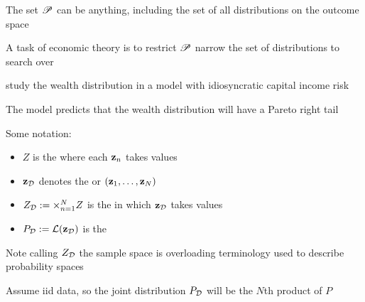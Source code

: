 \begin{frame}

    \vspace{2em}
    The set $\mathscr P$ can be anything, including the set of all distributions 
    on the outcome space
    
    \vspace{.7em}
    A task of economic theory is to restrict $\mathscr P$ narrow the set of 
    distributions to search over
    
    \vspace{.7em}
    \Eg
    \cite{benhabib2015wealth} study the wealth distribution in a model with
    idiosyncratic capital income risk
    
    The model predicts that the wealth
    distribution will have a Pareto right tail
    
\end{frame}

\begin{frame}
    
    \vspace{2em}
    Some notation:
    \begin{itemize}
        \label{enum:sen}
        \item $Z$ is the  where each 
            ${\mathbf z}_n$ takes values
        \item $\mathbf{z}_{\mathcal D}$ denotes the  or  $({\mathbf z}_1, \ldots,
            {\mathbf z}_N)$
        \item $Z_{\mathcal D} := \times_{n=1}^N Z$ is the  
            in which $\mathbf{z}_{\mathcal D}$ takes values
        \item $P_{\mathcal D} := \mathcal L(\mathbf{z}_{\mathcal D})$ is the 
    \end{itemize}
    
    Note calling $Z_{\mathcal D}$ the sample space is overloading terminology 
    used to describe probability spaces 
    
    \vspace{.7em}
    Assume {\sc iid} data, so the joint distribution
    $P_{\mathcal D}$ will be the $N$th product of $P$


\end{frame}


